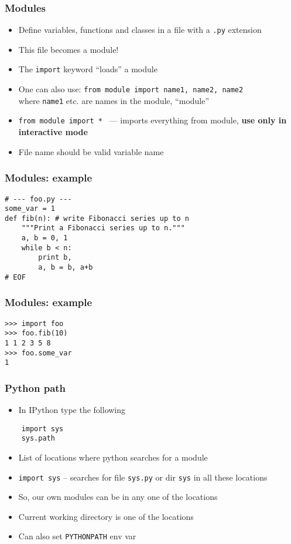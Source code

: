 \documentclass[12pt,presentation]{beamer}
\providecommand{\alert}[1]{\textbf{#1}}
\begin{document}
\begin{frame}
  \frametitle{Modules}
  \begin{itemize}
  \item Define variables, functions and classes in a file with a
    \texttt{.py} extension
  \item This file becomes a module!
  \item The \texttt{import} keyword ``loads'' a module
  \item One can also use:
    \mbox{\texttt{from module import name1, name2, name2}}\\
    where \texttt{name1} etc. are names in the module, ``module''
  \item \texttt{from module import *} \ --- imports everything from module,
    \alert{use only in interactive mode}
    \item File name should be valid variable name
  \end{itemize}
\end{frame}

\begin{frame}[fragile]
  \frametitle{Modules: example}
  \begin{lstlisting}
# --- foo.py ---
some_var = 1
def fib(n): # write Fibonacci series up to n
    """Print a Fibonacci series up to n."""
    a, b = 0, 1
    while b < n:
        print b,
        a, b = b, a+b
# EOF
  \end{lstlisting}
\end{frame}

\begin{frame}[fragile]
  \frametitle{Modules: example}
  \begin{lstlisting}
>>> import foo
>>> foo.fib(10)
1 1 2 3 5 8 
>>> foo.some_var
1
  \end{lstlisting}
\end{frame}


\begin{frame}[fragile]
  \frametitle{Python path}
  \begin{itemize}
  \item In IPython type the following
  \end{itemize}
  \begin{lstlisting}
    import sys
    sys.path
  \end{lstlisting}
  \begin{itemize}
  \item List of locations where python searches for a module
  \item \texttt{import sys} -- searches for file \texttt{sys.py} or
    dir \texttt{sys} in all these locations
  \item So, our own modules can be in any one of the locations
  \item Current working directory is one of the locations
  \item Can also set \texttt{PYTHONPATH} env var
  \end{itemize}
\end{frame}
\end{document}
